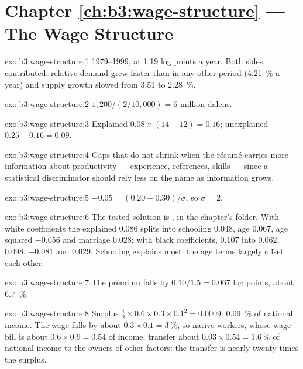 \section*{Chapter \ref{ch:b3:wage-structure} --- The Wage Structure}

\begin{solution}{exo:b3:wage-structure:1}
1979--1999, at 1.19 log points a year. Both sides contributed: relative demand grew faster
than in any other period (4.21~\% a year) and supply growth slowed from 3.51 to 2.28~\%. %
\end{solution}

\begin{solution}{exo:b3:wage-structure:2}
$1{,}200/(2/10{,}000) = 6$ million dalens.
\end{solution}

\begin{solution}{exo:b3:wage-structure:3}
Explained $0.08 \times (14 - 12) = 0.16$; unexplained $0.25 - 0.16 = 0.09$.
\end{solution}

\begin{solution}{exo:b3:wage-structure:4}
Gaps that do not shrink when the résumé carries more information about productivity
--- experience, references, skills --- since a statistical discriminator should rely
less on the name as information grows.
\end{solution}

\begin{solution}{exo:b3:wage-structure:5}
$-0.05 = (0.20 - 0.30)/\sigma$, so $\sigma = 2$.
\end{solution}

\begin{solution}{exo:b3:wage-structure:6}
The tested solution is , in the chapter's 
folder. With white coefficients the explained 0.086 splits into schooling 0.048, age 0.067,
age squared $-0.056$ and marriage 0.028; with black coefficients, 0.107 into 0.062, 0.098, $-0.081$
and 0.029. %
Schooling explains most: the age terms largely offset each other.
\end{solution}

\begin{solution}{exo:b3:wage-structure:7}
The premium falls by $0.10/1.5 = 0.067$ log points, about 6.7~\%.
\end{solution}

\begin{solution}{exo:b3:wage-structure:8}
Surplus $\tfrac12 \times 0.6 \times 0.3 \times 0.1^2 = 0.0009$: 0.09~\% of national income. The wage falls by about $0.3 \times 0.1 = 3~\%$, so
native workers, whose wage bill is about $0.6 \times 0.9 = 0.54$ of income, transfer about $0.03 \times 0.54 = 1.6~\%$ of
national income to the owners of other factors: the transfer is nearly twenty times the
surplus.
\end{solution}

